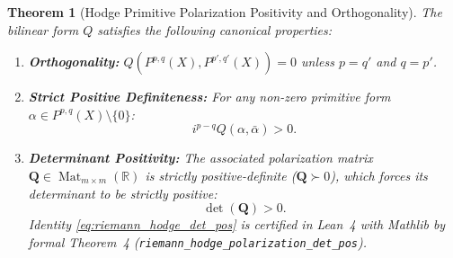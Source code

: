 \documentclass[11pt,a4paper]{article}
\theoremstyle{definition}
\theoremstyle{plain}
\newtheorem{theorem}[definition]{Theorem}
\begin{document}
\begin{theorem}[Hodge Primitive Polarization Positivity and Orthogonality]
\label{thm:riemann_hodge}
The bilinear form $Q$ satisfies the following canonical properties:
\begin{enumerate}[label=(\roman*)]
    \item \textbf{Orthogonality:} $Q(P^{p,q}(X), P^{p',q'}(X)) = 0$ unless $p = q'$ and $q = p'$.
    \item \textbf{Strict Positive Definiteness:} For any non-zero primitive form $\alpha \in P^{p,q}(X) \setminus \{0\}$:
    \begin{equation}
        \label{eq:riemann_hodge_positivity}
        i^{p-q} Q(\alpha, \bar{\alpha}) > 0.
    \end{equation}
    \item \textbf{Determinant Positivity:} The associated polarization matrix $\mathbf{Q} \in \operatorname{Mat}_{m \times m}(\mathbb{R})$ is strictly positive-definite ($\mathbf{Q} \succ 0$), which forces its determinant to be strictly positive:
    \begin{equation}
        \label{eq:riemann_hodge_det_pos}
        \det(\mathbf{Q}) > 0.
    \end{equation}
    Identity \eqref{eq:riemann_hodge_det_pos} is certified in Lean~4 with Mathlib by formal Theorem~4 (\texttt{riemann\_hodge\_polarization\_det\_pos}).
\end{enumerate}
\end{theorem}
\end{document}
